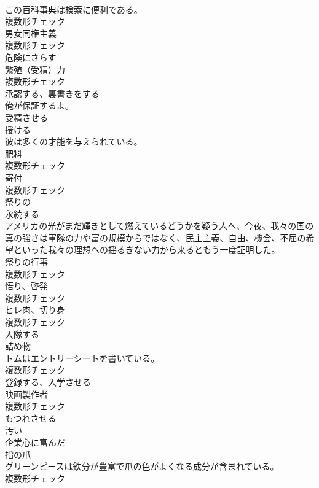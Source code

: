 \documentclass[8pt]{extreport}
\begin{document}
\begin{CJK}{UTF8}{min}
\\	この百科事典は検索に便利である。	
\\	複数形チェック
\\	[名詞]	男女同権主義	
\\	複数形チェック
\\	[動詞]	危険にさらす	
\\	[名詞]	繁殖（受精）力	
\\	複数形チェック
\\	[動詞]	承認する、裏書きをする	
\\	俺が保証するよ。	
\\	[動詞]	受精させる	
\\	[動詞]	授ける	
\\	彼は多くの才能を与えられている。	
\\	[名詞]	肥料	
\\	複数形チェック
\\	[名詞]	寄付	
\\	複数形チェック
\\	[形容詞]	祭りの	
\\	[形容詞]	永続する	
\\	アメリカの光がまだ輝きとして燃えているどうかを疑う人へ、今夜、我々の国の真の強さは軍隊の力や富の規模からではなく、民主主義、自由、機会、不屈の希望といった我々の理想への揺るぎない力から来るともう一度証明した。	
\\	[名詞]	祭りの行事	
\\	複数形チェック
\\	[名詞]	悟り、啓発	
\\	複数形チェック
\\	[名詞]	ヒレ肉、切り身	
\\	複数形チェック
\\	[動詞]	入隊する	
\\	[名詞]	詰め物	
\\	トムはエントリーシートを書いている。	
\\	複数形チェック
\\	[動詞]	登録する、入学させる	
\\	[名詞]	映画製作者	
\\	複数形チェック
\\	[動詞]	もつれさせる	
\\	[形容詞]	汚い	
\\	[形容詞]	企業心に富んだ	
\\	[名詞]	指の爪	
\\	グリーンピースは鉄分が豊富で爪の色がよくなる成分が含まれている。	
\\	複数形チェック

\end{CJK}
\end{document}
